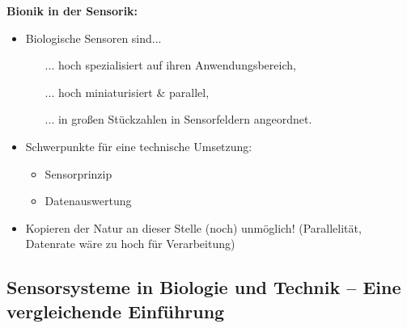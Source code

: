 \textbf{Bionik in der Sensorik:}
\begin{itemize}
\setlength\itemsep{0em}
\item Biologische Sensoren sind...
\begin{itemize}
\setlength\itemsep{0em}
\item[...] hoch spezialisiert auf ihren Anwendungsbereich,
\item[...] hoch miniaturisiert \& parallel,
\item[...] in großen \glqq Stückzahlen\grqq{} in Sensorfeldern angeordnet.
\end{itemize}
\item Schwerpunkte für eine technische Umsetzung:
\begin{itemize}
\setlength\itemsep{0em}
\item Sensorprinzip
\item Datenauswertung
\end{itemize}
\item Kopieren der Natur an dieser Stelle (noch) unmöglich! (Parallelität, Datenrate wäre zu hoch für Verarbeitung)
\end{itemize}
\subsection{Sensorsysteme in Biologie und Technik – Eine vergleichende Einführung}
